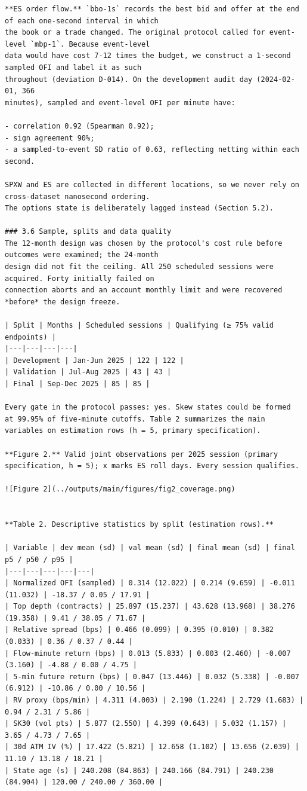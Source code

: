 \documentclass[11pt]{article}
\begin{document}
\begin{verbatim}
**ES order flow.** `bbo-1s` records the best bid and offer at the end of each one-second interval in which
the book or a trade changed. The original protocol called for event-level `mbp-1`. Because event-level
data would have cost 7-12 times the budget, we construct a 1-second sampled OFI and label it as such
throughout (deviation D-014). On the development audit day (2024-02-01, 366
minutes), sampled and event-level OFI per minute have:

- correlation 0.92 (Spearman 0.92);
- sign agreement 90%;
- a sampled-to-event SD ratio of 0.63, reflecting netting within each second.

SPXW and ES are collected in different locations, so we never rely on cross-dataset nanosecond ordering.
The options state is deliberately lagged instead (Section 5.2).

### 3.6 Sample, splits and data quality
The 12-month design was chosen by the protocol's cost rule before outcomes were examined; the 24-month
design did not fit the ceiling. All 250 scheduled sessions were acquired. Forty initially failed on
connection aborts and an account monthly limit and were recovered *before* the design freeze.

| Split | Months | Scheduled sessions | Qualifying (≥ 75% valid endpoints) |
|---|---|---|---|
| Development | Jan-Jun 2025 | 122 | 122 |
| Validation | Jul-Aug 2025 | 43 | 43 |
| Final | Sep-Dec 2025 | 85 | 85 |

Every gate in the protocol passes: yes. Skew states could be formed
at 99.95% of five-minute cutoffs. Table 2 summarizes the main
variables on estimation rows (h = 5, primary specification).

**Figure 2.** Valid joint observations per 2025 session (primary specification, h = 5); x marks ES roll days. Every session qualifies.

![Figure 2](../outputs/main/figures/fig2_coverage.png)


**Table 2. Descriptive statistics by split (estimation rows).**

| Variable | dev mean (sd) | val mean (sd) | final mean (sd) | final p5 / p50 / p95 |
|---|---|---|---|---|
| Normalized OFI (sampled) | 0.314 (12.022) | 0.214 (9.659) | -0.011 (11.032) | -18.37 / 0.05 / 17.91 |
| Top depth (contracts) | 25.897 (15.237) | 43.628 (13.968) | 38.276 (19.358) | 9.41 / 38.05 / 71.67 |
| Relative spread (bps) | 0.466 (0.099) | 0.395 (0.010) | 0.382 (0.033) | 0.36 / 0.37 / 0.44 |
| Flow-minute return (bps) | 0.013 (5.833) | 0.003 (2.460) | -0.007 (3.160) | -4.88 / 0.00 / 4.75 |
| 5-min future return (bps) | 0.047 (13.446) | 0.032 (5.338) | -0.007 (6.912) | -10.86 / 0.00 / 10.56 |
| RV proxy (bps/min) | 4.311 (4.003) | 2.190 (1.224) | 2.729 (1.683) | 0.94 / 2.31 / 5.86 |
| SK30 (vol pts) | 5.877 (2.550) | 4.399 (0.643) | 5.032 (1.157) | 3.65 / 4.73 / 7.65 |
| 30d ATM IV (%) | 17.422 (5.821) | 12.658 (1.102) | 13.656 (2.039) | 11.10 / 13.18 / 18.21 |
| State age (s) | 240.208 (84.863) | 240.166 (84.791) | 240.230 (84.904) | 120.00 / 240.00 / 360.00 |


\end{verbatim}
\end{document}
